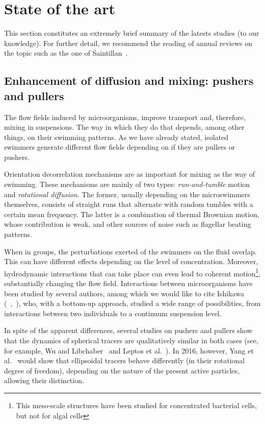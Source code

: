 \chapter{State of the art}
\label{SOA}

This section constitutes an extremely brief summary of the latests studies (to our knowledge). For further detail, we recommend the reading of annual reviews on the topic such as the one of Saintillan~\cite{Saintillan}.

\section{Enhancement of diffusion and mixing: pushers and pullers}
\label{SOA_mixing}

The flow fields induced by microorganisms, improve transport and, therefore, mixing in suspensions. The way in which they do that depends, among other things, on their swimming patterns. As we have already stated, isolated swimmers generate different flow fields depending on if they are pullers or pushers. 

Orientation decorrelation mechanisms are as important for mixing as the way of swimming. These mechanisms are mainly of two types: \textit{run-and-tumble} motion and \textit{rotational diffusion}. The former, usually depending on the microswimmers themselves, consists of straight runs that alternate with random tumbles with a certain mean frequency. The latter is a combination of thermal Brownian motion, whose contribution is weak, and other sources of noise such as flagellar beating patterns.

When in groups, the perturbations exerted of the swimmers on the fluid overlap. This can have different effects depending on the level of concentration. Moreover, hydrodynamic interactions that can take place can even lead to coherent motion\footnote{This meso-scale structures have been studied for concentrated bacterial cells, but not for algal cells}, substantially changing the flow field. Interactions between microorganisms have been studied by several authors, among which we would like to cite Ishikawa (~\cite{Ishikawa},~\cite{Ishikawa9}), who, with a bottom-up approach, studied a wide range of possibilities, from interactions between two individuals to a continuum suspension level.

In spite of the apparent differences, several studies on pushers and pullers show that the dynamics of spherical tracers are qualitatively similar in both cases (see, for example, Wu and Libchaber~\cite{Wu} and Leptos et al.~\cite{Leptos}). In 2016, however, Yang et al.~\cite{Yang} would show that ellipsoidal tracers behave differently (in their rotational degree of freedom), depending on the nature of the present active particles, allowing their distinction.

